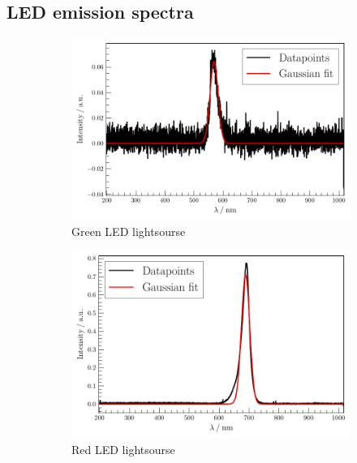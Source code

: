 \subsection{LED emission spectra}
\label{sec:LED}
\begin{figure}
    \centering
\begin{subfigure}{.32\textwidth}
    \centering
    \includegraphics[width=\textwidth]{plots/LED-Green.pdf}
    \caption{Green LED lightsourse}
    \label{fig:LEDG}
\end{subfigure}
\begin{subfigure}{.32\textwidth}
    \centering
    \includegraphics[width=\textwidth]{plots/LED-Red.pdf}
    \caption{Red LED lightsourse}
    \label{fig:LEDR}
\end{subfigure}
\begin{subfigure}{.32\textwidth}
    \centering

\end{subfigure}
\end{figure}
